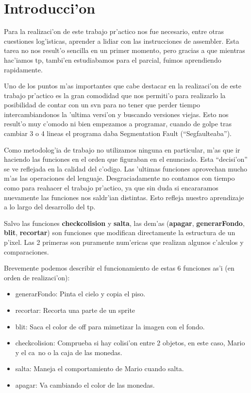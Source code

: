 \section{Introducci'on}

	Para la realizaci'on de este trabajo pr'actico nos fue necesario, entre
otras cuestiones log'isticas, aprender a lidiar con las instrucciones de assembler.
Esta tarea no nos result'o sencilla en un primer momento, pero gracias a que
mientras hac'iamos tp, tambi'en estudiabamos para el parcial, fuimos aprendiendo
rapidamente.

	Uno de los puntos m'as importantes que cabe destacar en la
realizaci'on de este trabajo pr'actico es la gran comodidad que nos permiti'o
para realizarlo la posibilidad de contar con un svn para no tener que perder
tiempo intercambiandonos la 'ultima versi'on y buscando versiones viejas. Esto
nos result'o muy c'omodo ni bien empezamos a programar, cuando de golpe tras
cambiar 3 o 4 lineas el programa daba Segmentation Fault (``Segfaulteaba'').

	Como metodolog'ia de trabajo no utilizamos ninguna en particular, m'as que
ir haciendo las funciones en el orden que figuraban en el enunciado. Esta
``decisi'on'' se ve reflejada en la calidad del c'odigo. Las 'ultimas funciones
aprovechan mucho m'as las operaciones del lenguaje. Desgraciadamente no
contamos con tiempo como para reahacer el trabajo pr'actico, ya que sin duda si
encararamos nuevamente las funciones nos saldr'ian distintas. Esto refleja
nuestro aprendizaje a lo largo del desarrollo del tp.

	Salvo las funciones \textbf{checkcolision} y \textbf{salta}, las dem'as
(\textbf{apagar}, \textbf{generarFondo}, \textbf{blit}, \textbf{recortar}) son
funciones que modifican directamente la estructura de un p'ixel. Las 2 primeras
son puramente num'ericas que realizan algunos c'alculos y comparaciones.

	Brevemente podemos describir el funcionamiento de estas 6 funciones as'i
(en orden de realizaci'on):

\begin{itemize}
	\item generarFondo: Pinta el cielo y copia el piso.
	\item recortar: Recorta una parte de un sprite
	\item blit: Saca el color de off para mimetizar la imagen con el fondo.
	\item checkcolision: Comprueba si hay colisi'on entre 2 objetos, en este
caso, Mario y el ca~no o la caja de las monedas.
	\item salta: Maneja el comportamiento de Mario cuando salta.
	\item apagar: Va cambiando el color de las monedas.
\end{itemize}

